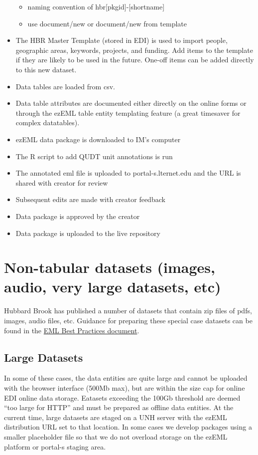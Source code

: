 \documentclass[
  letterpaper,
  DIV=11,
  numbers=noendperiod]{scrreprt}
\providecommand{\tightlist}{%
  \setlength{\itemsep}{0pt}\setlength{\parskip}{0pt}}\usepackage{longtable,booktabs,array}
\begin{document}
\begin{itemize}
  \begin{itemize}
  \tightlist
  \item
    naming convention of hbr{[}pkgid{]}-{[}shortname{]}
  \item
    use document/new or document/new from template
  \end{itemize}
\item
  The HBR Master Template (stored in EDI) is used to import people,
  geographic areas, keywords, projects, and funding. Add items to the
  template if they are likely to be used in the future. One-off items
  can be added directly to this new dataset.
\item
  Data tables are loaded from csv.
\item
  Data table attributes are documented either directly on the online
  forms or through the ezEML table entity templating feature (a great
  timesaver for complex datatables).
\item
  ezEML data package is downloaded to IM's computer
\item
  The R script to add QUDT unit annotations is run
\item
  The annotated eml file is uploaded to portal-s.lternet.edu and the URL
  is shared with creator for review
\item
  Subsequent edits are made with creator feedback
\item
  Data package is approved by the creator
\item
  Data package is uploaded to the live repository
\end{itemize}

\section{Non-tabular datasets (images, audio, very large datasets,
etc)}\label{non-tabular-datasets-images-audio-very-large-datasets-etc}

Hubbard Brook has published a number of datasets that contain zip files
of pdfs, images, audio files, etc. Guidance for preparing these special
case datasets can be found in the
\href{https://ediorg.github.io/data-package-best-practices/data-package-design-for-special-cases.html}{EML
Best Practices document}.

\subsection{Large Datasets}\label{large-datasets}

In some of these cases, the data entities are quite large and cannot be
uploaded with the browser interface (500Mb max), but are within the size
cap for online EDI online data storage. Eatasets exceeding the 100Gb
threshold are deemed ``too large for HTTP'' and must be prepared as
offline data entities. At the current time, large datasets are staged on
a UNH server with the ezEML distribution URL set to that location. In
some cases we develop packages using a smaller placeholder file so that
we do not overload storage on the ezEML platform or portal-s staging
area.
\end{document}
